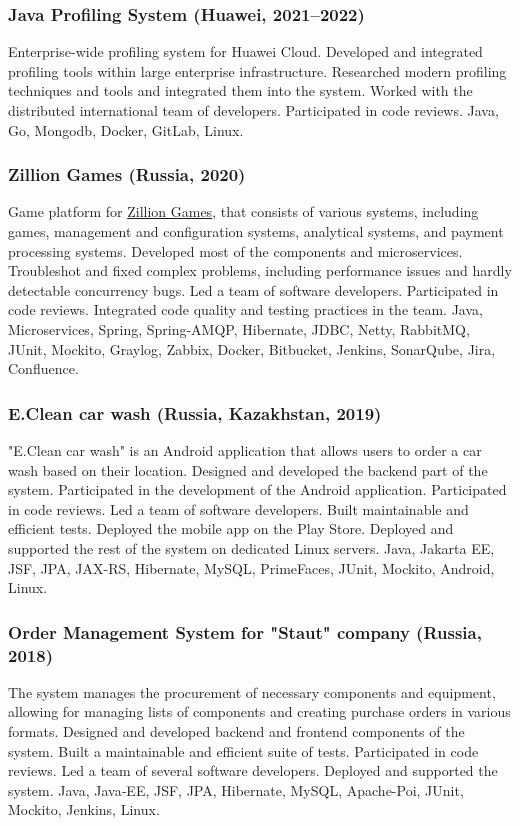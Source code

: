 \documentclass{vl}
\begin{document}
    \subsubsection*{Java Profiling System (Huawei, 2021--2022)}
    Enterprise-wide profiling system for Huawei Cloud.
    Developed and integrated profiling tools within large enterprise infrastructure.
    Researched modern profiling techniques and tools and integrated them into the system.
    Worked with the distributed international team of developers.
    Participated in code reviews.
    Java, Go, Mongodb, Docker, GitLab, Linux.

    \subsubsection*{Zillion Games (Russia, 2020)}
    Game platform for \href{http://zillion.games/}{Zillion Games}, that consists of various systems, including games,
    management and configuration systems, analytical systems, and payment processing systems.
    Developed most of the components and microservices.
    Troubleshot and fixed complex problems, including performance issues and hardly detectable concurrency bugs.
    Led a team of software developers.
    Participated in code reviews.
    Integrated code quality and testing practices in the team.
    Java, Microservices, Spring, Spring-AMQP, Hibernate, JDBC, Netty, RabbitMQ, JUnit, Mockito, Graylog, Zabbix, Docker,
    Bitbucket, Jenkins, SonarQube, Jira, Confluence.

    \subsubsection*{E.Clean car wash (Russia, Kazakhstan, 2019)}
    "E.Clean car wash" is an Android application
    that allows users to order a car wash based on their location.
    Designed and developed the backend part of the system.
    Participated in the development of the Android application.
    Participated in code reviews.
    Led a team of software developers.
    Built maintainable and efficient tests.
    Deployed the mobile app on the Play Store.
    Deployed and supported the rest of the system on dedicated Linux servers.
    Java, Jakarta EE, JSF, JPA, JAX-RS, Hibernate, MySQL, PrimeFaces, JUnit, Mockito, Android, Linux.

    \subsubsection*{Order Management System for "Staut" company (Russia, 2018)}
    The system manages the procurement of necessary components and equipment,
    allowing for managing lists of components and creating purchase orders in various formats.
    Designed and developed backend and frontend components of the system.
    Built a maintainable and efficient suite of tests.
    Participated in code reviews.
    Led a team of several software developers.
    Deployed and supported the system.
    Java, Java‐EE, JSF, JPA, Hibernate, MySQL, Apache-Poi, JUnit, Mockito, Jenkins, Linux.
\end{document}
